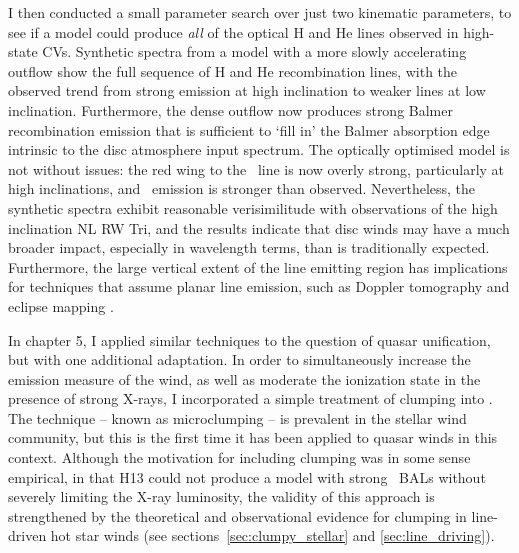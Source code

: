 I then conducted a small parameter search over just two kinematic parameters, 
to see if a model could produce {\em all} of the optical H and He lines observed 
in high-state CVs. Synthetic spectra from a model 
with a more slowly accelerating outflow show 
the full sequence of H and He recombination lines, with 
the observed trend from strong emission at high inclination to weaker lines
at low inclination. Furthermore, the dense outflow now produces strong Balmer
recombination emission that is sufficient to `fill in' the Balmer 
absorption edge intrinsic to the disc atmosphere input spectrum. The optically
optimised model is not without issues: the red wing to the \civ\ line
is now overly strong, particularly at high inclinations, and \heii\ emission
is stronger than observed. Nevertheless, the synthetic spectra exhibit
reasonable verisimilitude with observations of the high inclination NL RW Tri,
and the results indicate that disc winds may have a much broader impact,
especially in wavelength terms, than is traditionally expected. Furthermore,
the large vertical extent of the line emitting region has implications
for techniques that assume planar line emission, such as Doppler tomography 
\citep[e.g.][]{marsh1988} and eclipse mapping \citep[e.g.][]{horne1994}.

In chapter 5, I applied similar techniques to the question of quasar 
unification, but with one additional adaptation. In order to simultaneously
increase the emission measure of the wind, as well as moderate the ionization
state in the presence of strong X-rays, I incorporated a simple treatment of clumping 
into \py. The technique -- known as microclumping -- is prevalent 
in the stellar wind community, but this is the first time it has been
applied to quasar winds in this context. Although the motivation for including
clumping was in some sense empirical, in that H13 could not produce a 
model with strong \civ\ BALs without severely limiting the X-ray luminosity, 
the validity of this approach is strengthened by the theoretical and observational
evidence for clumping in line-driven hot star winds 
(see sections~\ref{sec:clumpy_stellar} and \ref{sec:line_driving}).

